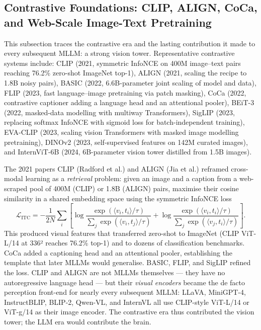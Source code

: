 \documentclass{article}
\begin{document}
\subsection{Contrastive Foundations: CLIP, ALIGN, CoCa, and Web-Scale Image-Text Pretraining}\label{contrastive-foundations-clip-align-coca-and-web-scale-image-text-pretraining}

This subsection traces the contrastive era and the lasting contribution it made to every subsequent MLLM: a strong vision tower. Representative contrastive systems include: CLIP (2021, symmetric InfoNCE on 400M image--text pairs reaching 76.2\% zero-shot ImageNet top-1), ALIGN (2021, scaling the recipe to 1.8B noisy pairs), BASIC (2022, 6.6B-parameter joint scaling of model and data), FLIP (2023, fast language--image pretraining via patch masking), CoCa (2022, contrastive captioner adding a language head and an attentional pooler), BEiT-3 (2022, masked-data modelling with multiway Transformers), SigLIP (2023, replacing softmax InfoNCE with sigmoid loss for batch-independent training), EVA-CLIP (2023, scaling vision Transformers with masked image modelling pretraining), DINOv2 (2023, self-supervised features on 142M curated images), and InternViT-6B (2024, 6B-parameter vision tower distilled from 1.5B images).

The 2021 papers CLIP (Radford et al.) and ALIGN (Jia et al.) reframed cross-modal learning as a \emph{retrieval} problem: given an image and a caption from a web-scraped pool of 400M (CLIP) or 1.8B (ALIGN) pairs, maximise their cosine similarity in a shared embedding space using the symmetric InfoNCE loss
\[\mathcal{L}_{\text{ITC}} = -\frac{1}{2N}\sum_i \left[\log\frac{\exp(\langle v_i, t_i\rangle / \tau)}{\sum_j \exp(\langle v_i, t_j\rangle/\tau)} + \log\frac{\exp(\langle v_i, t_i\rangle/\tau)}{\sum_j \exp(\langle v_j, t_i\rangle/\tau)}\right].\]
This produced visual features that transferred zero-shot to ImageNet (CLIP ViT-L/14 at 336² reaches 76.2\% top-1) and to dozens of classification benchmarks. CoCa \citep{yu20222022} added a captioning head and an attentional pooler, establishing the template that later MLLMs would generalise. BASIC, FLIP, and SigLIP refined the loss. CLIP and ALIGN are not MLLMs themselves --- they have no autoregressive language head --- but their \emph{visual encoders} became the de facto perception front-end for nearly every subsequent MLLM: LLaVA, MiniGPT-4, InstructBLIP, BLIP-2, Qwen-VL, and InternVL all use CLIP-style ViT-L/14 or ViT-g/14 as their image encoder. The contrastive era thus contributed the vision tower; the LLM era would contribute the brain.
\end{document}
